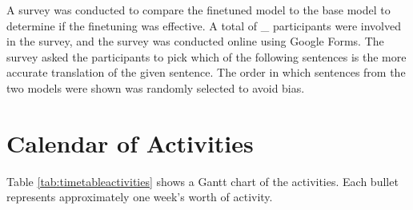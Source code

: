 A survey was conducted to compare the finetuned model to the base model to determine if the finetuning was effective. A total of _ participants were involved in the survey, and the survey was conducted online using Google Forms. The survey asked the participants to pick which of the following sentences is the more accurate translation of the given sentence. The order in which sentences from the two models were shown was randomly selected to avoid bias.


\section{Calendar of Activities}

	Table \ref{tab:timetableactivities} shows a Gantt chart of the activities.  Each bullet represents approximately
	one week's worth of activity.
	
	\newcommand{\weekone}{\textbullet}
	\newcommand{\weektwo}{\textbullet \textbullet}
	\newcommand{\weekthree}{\textbullet \textbullet \textbullet}
	\newcommand{\weekfour}{\textbullet \textbullet \textbullet \textbullet}
	
